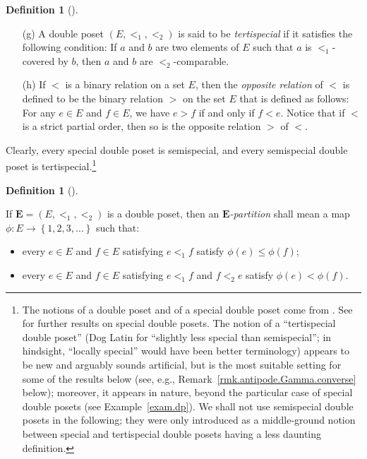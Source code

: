 \documentclass[numbers=enddot,12pt,final,onecolumn,notitlepage,abstracton]{scrartcl}%
\theoremstyle{definition}
\newtheorem{defi}[theo]{Definition}
\newenvironment{definition}[1][]
{\begin{defi}[#1]\begin{leftbar}}
{\end{leftbar}\end{defi}}
\newcommand{\EE}{{\mathbf{E}}}
\begin{document}
\begin{definition}
\begin{itemize}
\item[(g)] A double poset
$\left(E, <_1, <_2\right)$ is said to be \textit{tertispecial} if
it satisfies the following condition: If $a$ and $b$ are two
elements of $E$ such that $a$ is $<_1$-covered by $b$, then $a$
and $b$ are $<_2$-comparable.

\item[(h)] If $<$ is a binary relation on a set $E$, then the
\textit{opposite relation} of $<$ is defined to be the binary
relation $>$ on the set $E$ that is defined as follows: For any
$e \in E$ and $f \in E$, we have $e > f$ if and only if $f < e$.
Notice that if $<$ is a strict partial order, then so
is the opposite relation $>$ of $<$.
\end{itemize}
\end{definition}

Clearly, every special double poset is semispecial, and every
semispecial double poset is tertispecial.\footnote{The notions of a
double poset and of a special double poset come from
\cite{Mal-Reu-DP}. See \cite{Foissy13} for further results on
special double posets.
The notion of a ``tertispecial double poset''
(Dog Latin for ``slightly less special than semispecial''; in
hindsight, ``locally special'' would have been better terminology)
appears to be new and arguably sounds artificial, but is the
most suitable setting for some of the results below (see, e.g.,
Remark~\ref{rmk.antipode.Gamma.converse} below); moreover,
it appears in nature, beyond the particular case of special
double posets (see Example~\ref{exam.dp}).
We shall not use semispecial
double posets in the following; they were only introduced as a
middle-ground notion between special and tertispecial double posets
having a less daunting definition.}

\begin{definition}
\label{def.E-partition}
If $\EE = \left(E, <_1, <_2\right)$ is a double poset, then
an \textit{$\EE$-partition} shall mean a map
$\phi : E \to \left\{ 1,2,3,\ldots\right\}$ such that:
\begin{itemize}
\item every $e \in E$ and $f \in E$ satisfying $e <_1 f$ satisfy
$\phi\left(e\right) \leq \phi\left(f\right)$;
\item every $e \in E$ and $f \in E$ satisfying $e <_1 f$ and
$f <_2 e$ satisfy $\phi\left(e\right) < \phi\left(f\right)$.
\end{itemize}
\end{definition}
\end{document}
